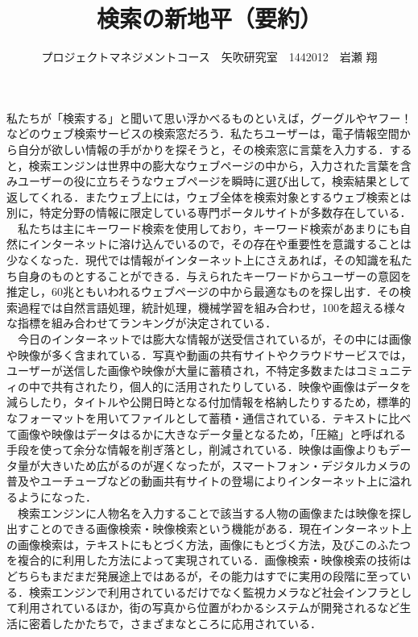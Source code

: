 \documentclass[uplatex,twocolumn,dvipdfmx]{jsarticle}
\title{\vspace{-5mm}\fontsize{14pt}{0pt}\selectfont 検索の新地平（要約）}
\author{\normalsize プロジェクトマネジメントコース　矢吹研究室　1442012　岩瀬 翔}
\date{}
\begin{document}
\fontsize{10.5pt}{\baselineskip}\selectfont
\maketitle





私たちが「検索する」と聞いて思い浮かべるものといえば，グーグルやヤフー！などのウェブ検索サービスの検索窓だろう．私たちユーザーは，電子情報空間から自分が欲しい情報の手がかりを探そうと，その検索窓に言葉を入力する．すると，検索エンジンは世界中の膨大なウェブページの中から，入力された言葉を含みユーザーの役に立ちそうなウェブページを瞬時に選び出して，検索結果として返してくれる．またウェブ上には，ウェブ全体を検索対象とするウェブ検索とは別に，特定分野の情報に限定している専門ポータルサイトが多数存在している．\\
　私たちは主にキーワード検索を使用しており，キーワード検索があまりにも自然にインターネットに溶け込んでいるので，その存在や重要性を意識することは少なくなった．現代では情報がインターネット上にさえあれば，その知識を私たち自身のものとすることができる．与えられたキーワードからユーザーの意図を推定し，60兆ともいわれるウェブページの中から最適なものを探し出す．その検索過程では自然言語処理，統計処理，機械学習を組み合わせ，100を超える様々な指標を組み合わせてランキングが決定されている．\\
　今日のインターネットでは膨大な情報が送受信されているが，その中には画像や映像が多く含まれている．写真や動画の共有サイトやクラウドサービスでは，ユーザーが送信した画像や映像が大量に蓄積され，不特定多数またはコミュニティの中で共有されたり，個人的に活用されたりしている．映像や画像はデータを減らしたり，タイトルや公開日時となる付加情報を格納したりするため，標準的なフォーマットを用いてファイルとして蓄積・通信されている．テキストに比べて画像や映像はデータはるかに大きなデータ量となるため，「圧縮」と呼ばれる手段を使って余分な情報を削ぎ落とし，削減されている．映像は画像よりもデータ量が大きいため広がるのが遅くなったが，スマートフォン・デジタルカメラの普及やユーチューブなどの動画共有サイトの登場によりインターネット上に溢れるようになった．\\
　検索エンジンに人物名を入力することで該当する人物の画像または映像を探し出すことのできる画像検索・映像検索という機能がある．現在インターネット上の画像検索は，テキストにもとづく方法，画像にもとづく方法，及びこのふたつを複合的に利用した方法によって実現されている．画像検索・映像検索の技術はどちらもまだまだ発展途上ではあるが，その能力はすでに実用の段階に至っている．検索エンジンで利用されているだけでなく監視カメラなど社会インフラとして利用されているほか，街の写真から位置がわかるシステムが開発されるなど生活に密着したかたちで，さまざまなところに応用されている．\\
\end{document}
